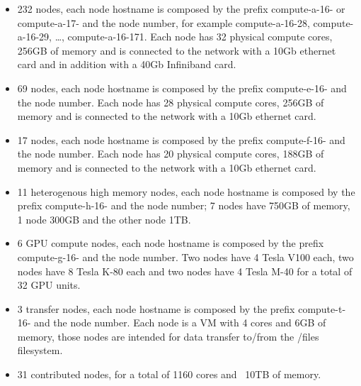 \documentclass[11pt]{amsart}
\begin{document}
\begin{itemize}

\item 232 nodes, each node hostname is composed by the prefix compute-a-16- or compute-a-17- and the node number, for example compute-a-16-28, compute-a-16-29, …​, compute-a-16-171. Each node has 32 physical compute cores, 256GB of memory and is connected to the network with a 10Gb ethernet card and in addition with a 40Gb Infiniband card.

\item 69 nodes, each node hostname is composed by the prefix compute-e-16- and the node number. Each node has 28 physical compute cores, 256GB of memory and is connected to the network with a 10Gb ethernet card.

\item 17 nodes, each node hostname is composed by the prefix compute-f-16- and the node number. Each node has 20 physical compute cores, 188GB of memory and is connected to the network with a 10Gb ethernet card.

\item 11 heterogenous high memory nodes, each node hostname is composed by the prefix compute-h-16- and the node number; 7 nodes have 750GB of memory, 1 node 300GB and the other node 1TB.

\item 6 GPU compute nodes, each node hostname is composed by the prefix compute-g-16- and the node number. Two nodes have 4 Tesla V100 each, two nodes have 8 Tesla K-80 each and two nodes have 4 Tesla M-40 for a total of 32 GPU units.

\item 3 transfer nodes, each node hostname is composed by the prefix compute-t-16- and the node number. Each node is a VM with 4 cores and 6GB of memory, those nodes are intended for data transfer to/from the /files filesystem.

\item 31 contributed nodes, for a total of 1160 cores and ~10TB of memory.

\end{itemize}
\end{document}
